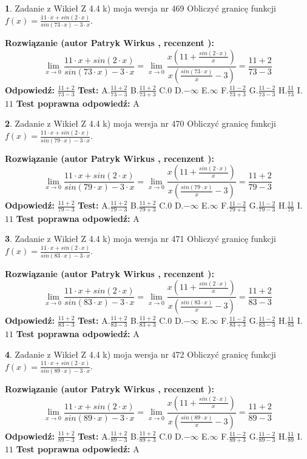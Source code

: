 \documentclass[12pt, a4paper]{article}
\theoremstyle{definition} %
\newtheorem{zad}{}
\newcommand{\zadStart}[1]{\begin{zad}#1\newline}
\newcommand{\zadStop}{\end{zad}}
\newcommand{\rozwStart}[2]{\noindent \textbf{Rozwiązanie (autor #1 , recenzent #2): }\newline}
\newcommand{\rozwStop}{\newline}
\newcommand{\odpStart}{\noindent \textbf{Odpowiedź:}\newline}
\newcommand{\odpStop}{\newline}
\newcommand{\testStart}{\noindent \textbf{Test:}\newline}
\newcommand{\testStop}{\newline}
\newcommand{\kluczStart}{\noindent \textbf{Test poprawna odpowiedź:}\newline}
\newcommand{\kluczStop}{\newline}
\begin{document}
\zadStart{Zadanie z Wikieł Z 4.4 k) moja wersja nr 469}
Obliczyć granicę funkcji $f(x)=\frac{11\cdot x +sin(2\cdot x)}{sin(73\cdot x) -3\cdot x}$.
\zadStop
\rozwStart{Patryk Wirkus}{}
$$\lim\limits_{x\to 0}\frac{11\cdot x +sin(2\cdot x)}{sin(73\cdot x) -3\cdot x}
=\lim\limits_{x\to 0}\frac{x(11+\frac{sin(2\cdot x)}{x})}{x(\frac{sin(73\cdot x)}{x}-3)}
=\frac{11+2}{73-3}$$
\rozwStop
\odpStart
$\frac{11+2}{73-3}$
\odpStop
\testStart
A.$\frac{11+2}{73-3}$
B.$\frac{11+2}{73+3}$
C.$0$
D.$-\infty$
E.$\infty$
F.$\frac{11-2}{73+3}$
G.$\frac{11-2}{73-3}$
H.$\frac{11}{73}$
I.$11$
\testStop
\kluczStart
A
\kluczStop



\zadStart{Zadanie z Wikieł Z 4.4 k) moja wersja nr 470}
Obliczyć granicę funkcji $f(x)=\frac{11\cdot x +sin(2\cdot x)}{sin(79\cdot x) -3\cdot x}$.
\zadStop
\rozwStart{Patryk Wirkus}{}
$$\lim\limits_{x\to 0}\frac{11\cdot x +sin(2\cdot x)}{sin(79\cdot x) -3\cdot x}
=\lim\limits_{x\to 0}\frac{x(11+\frac{sin(2\cdot x)}{x})}{x(\frac{sin(79\cdot x)}{x}-3)}
=\frac{11+2}{79-3}$$
\rozwStop
\odpStart
$\frac{11+2}{79-3}$
\odpStop
\testStart
A.$\frac{11+2}{79-3}$
B.$\frac{11+2}{79+3}$
C.$0$
D.$-\infty$
E.$\infty$
F.$\frac{11-2}{79+3}$
G.$\frac{11-2}{79-3}$
H.$\frac{11}{79}$
I.$11$
\testStop
\kluczStart
A
\kluczStop



\zadStart{Zadanie z Wikieł Z 4.4 k) moja wersja nr 471}
Obliczyć granicę funkcji $f(x)=\frac{11\cdot x +sin(2\cdot x)}{sin(83\cdot x) -3\cdot x}$.
\zadStop
\rozwStart{Patryk Wirkus}{}
$$\lim\limits_{x\to 0}\frac{11\cdot x +sin(2\cdot x)}{sin(83\cdot x) -3\cdot x}
=\lim\limits_{x\to 0}\frac{x(11+\frac{sin(2\cdot x)}{x})}{x(\frac{sin(83\cdot x)}{x}-3)}
=\frac{11+2}{83-3}$$
\rozwStop
\odpStart
$\frac{11+2}{83-3}$
\odpStop
\testStart
A.$\frac{11+2}{83-3}$
B.$\frac{11+2}{83+3}$
C.$0$
D.$-\infty$
E.$\infty$
F.$\frac{11-2}{83+3}$
G.$\frac{11-2}{83-3}$
H.$\frac{11}{83}$
I.$11$
\testStop
\kluczStart
A
\kluczStop



\zadStart{Zadanie z Wikieł Z 4.4 k) moja wersja nr 472}
Obliczyć granicę funkcji $f(x)=\frac{11\cdot x +sin(2\cdot x)}{sin(89\cdot x) -3\cdot x}$.
\zadStop
\rozwStart{Patryk Wirkus}{}
$$\lim\limits_{x\to 0}\frac{11\cdot x +sin(2\cdot x)}{sin(89\cdot x) -3\cdot x}
=\lim\limits_{x\to 0}\frac{x(11+\frac{sin(2\cdot x)}{x})}{x(\frac{sin(89\cdot x)}{x}-3)}
=\frac{11+2}{89-3}$$
\rozwStop
\odpStart
$\frac{11+2}{89-3}$
\odpStop
\testStart
A.$\frac{11+2}{89-3}$
B.$\frac{11+2}{89+3}$
C.$0$
D.$-\infty$
E.$\infty$
F.$\frac{11-2}{89+3}$
G.$\frac{11-2}{89-3}$
H.$\frac{11}{89}$
I.$11$
\testStop
\kluczStart
A
\kluczStop
\end{document}

